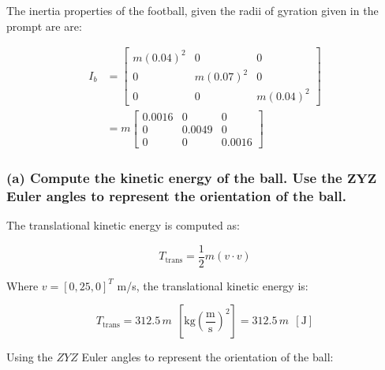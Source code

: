 \documentclass[12pt, letterpaper]{../assignment}
\begin{document}
The inertia properties of the football, given the radii of gyration given in the prompt are are:

\begin{equation*}
  \begin{aligned}
    I_b
    &= \left[\begin{array}{ccc}
      m (0.04)^2 & 0 & 0\\
      0 & m (0.07)^2 & 0\\
      0 & 0 & m (0.04)^2
      \end{array}\right]\\
    &= m\left[\begin{array}{ccc} 0.0016 & 0 & 0\\ 0 & 0.0049 & 0\\ 0 & 0 & 0.0016 \end{array}\right]
  \end{aligned}
\end{equation*}

\subsubsection*{(a) Compute the kinetic energy of the ball.
Use the $\bm{ZYZ}$ Euler angles to represent the orientation of the ball.}

The translational kinetic energy is computed as:

$$ T_\text{trans} = \frac{1}{2}m\left( v \cdot v \right) $$

Where $v = [0,25,0]^T$ m/s, the translational kinetic energy is:

$$ T_\text{trans} = 312.5\,m \ \ \left[\text{kg}\left(\frac{\text{m}}{\text{s}}\right)^2\right] =  312.5\,m \ \ \left[\text{J}\right] $$

Using the $ZYZ$ Euler angles to represent the orientation of the ball:
\end{document}
